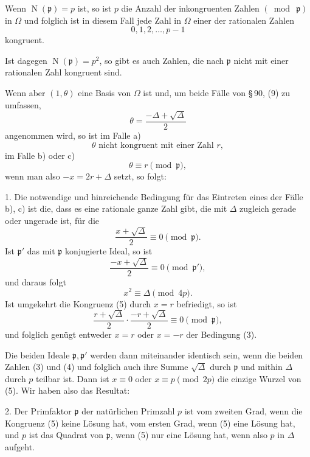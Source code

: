 \documentclass[11pt]{article}
\newcommand{\Norm}{\operatorname{N}}
\begin{document}
Wenn $\Norm(\mathfrak p)=p$ ist, so ist $p$ die Anzahl der inkongruenten Zahlen $(\bmod\ \mathfrak p)$ in $\Omega$ und folglich ist in diesem Fall jede Zahl in $\Omega$ einer der rationalen Zahlen
\begin{equation}
0,1,2,\ldots,p-1
\tag{1}
\end{equation}
kongruent.

Ist dagegen $\Norm(\mathfrak p)=p^2$, so gibt es auch Zahlen, die nach $\mathfrak p$ nicht mit einer rationalen Zahl kongruent sind.

Wenn aber $(1,\theta)$ eine Basis von $\Omega$ ist und, um beide Fälle von \S\,90, (9) zu umfassen,
\begin{equation}
 \theta=\frac{-\Delta+\sqrt\Delta}{2}
\tag{2}
\end{equation}
angenommen wird, so ist im Falle a)
\[
 \theta\text{ nicht kongruent mit einer Zahl }r,
\]
im Falle b) oder c)
\[
 \theta\equiv r\pmod{\mathfrak p},
\]
wenn man also $-x=2r+\Delta$ setzt, so folgt:

1. Die notwendige und hinreichende Bedingung für das Eintreten eines der Fälle b), c) ist die, dass es eine rationale ganze Zahl gibt, die mit $\Delta$ zugleich gerade oder ungerade ist, für die
\begin{equation}
 \frac{x+\sqrt\Delta}{2}\equiv0\pmod{\mathfrak p}.
\tag{3}
\end{equation}
Ist $\mathfrak p'$ das mit $\mathfrak p$ konjugierte Ideal, so ist
\begin{equation}
 \frac{-x+\sqrt\Delta}{2}\equiv0\pmod{\mathfrak p'},
\tag{4}
\end{equation}
und daraus folgt
\begin{equation}
 x^2\equiv\Delta\pmod{4p}.
\tag{5}
\end{equation}
Ist umgekehrt die Kongruenz (5) durch $x=r$ befriedigt, so ist
\[
 \frac{r+\sqrt\Delta}{2}\cdot\frac{-r+\sqrt\Delta}{2}\equiv0\pmod{\mathfrak p},
\]
und folglich genügt entweder $x=r$ oder $x=-r$ der Bedingung (3).

Die beiden Ideale $\mathfrak p,\mathfrak p'$ werden dann miteinander identisch sein, wenn die beiden Zahlen (3) und (4) und folglich auch ihre Summe $\sqrt\Delta$ durch $\mathfrak p$ und mithin $\Delta$ durch $p$ teilbar ist. Dann ist $x\equiv0$ oder $x\equiv p\pmod{2p}$ die einzige Wurzel von (5). Wir haben also das Resultat:

2. Der Primfaktor $\mathfrak p$ der natürlichen Primzahl $p$ ist vom zweiten Grad, wenn die Kongruenz (5) keine Lösung hat, vom ersten Grad, wenn (5) eine Lösung hat, und $p$ ist das Quadrat von $\mathfrak p$, wenn (5) nur eine Lösung hat, wenn also $p$ in $\Delta$ aufgeht.
\end{document}
